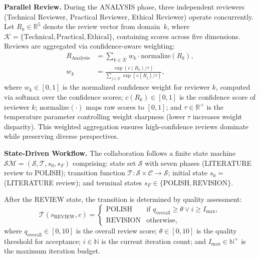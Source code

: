 \documentclass[runningheads]{llncs}
\begin{document}
\textbf{Parallel Review.} During the ANALYSIS phase, three independent reviewers (Technical Reviewer, Practical Reviewer, Ethical Reviewer) operate concurrently. Let $R_k \in \mathbb{R}^5$ denote the review vector from domain~$k$, where $\mathcal{K} = \{\text{Technical}, \text{Practical}, \text{Ethical}\}$, containing scores across five dimensions. Reviews are aggregated via confidence-aware weighting:
\begin{align}
    R_{\text{Analysis}} &= \sum_{k \in \mathcal{K}} w_k \cdot \text{normalize}(R_k), \\
    w_k &= \frac{\exp(c(R_k) / \tau)}{\sum_{j \in \mathcal{K}} \exp(c(R_j) / \tau)},
\end{align}
where $w_k \in [0, 1]$ is the normalized confidence weight for reviewer $k$, computed via softmax over the confidence scores; $c(R_k) \in [0, 1]$ is the confidence score of reviewer $k$; $\text{normalize}(\cdot)$ maps raw scores to $[0, 1]$; and $\tau \in \mathbb{R}^+$ is the temperature parameter controlling weight sharpness (lower $\tau$ increases weight disparity). This weighted aggregation ensures high-confidence reviews dominate while preserving diverse perspectives.

\textbf{State-Driven Workflow.} The collaboration follows a finite state machine $\mathcal{SM} = (\mathcal{S}, \mathcal{T}, s_0, s_F)$ comprising: state set $\mathcal{S}$ with seven phases (LITERATURE review to POLISH); transition function $\mathcal{T}: \mathcal{S} \times \mathcal{C} \rightarrow \mathcal{S}$; initial state $s_0 = $ (LITERATURE review); and terminal states $s_F \in \{\text{POLISH}, \text{REVISION}\}$.

After the REVIEW state, the transition is determined by quality assessment:
\begin{equation}
    \mathcal{T}(s_{\text{REVIEW}}, c) =
    \begin{cases}
        \text{POLISH} & \text{if } q_{\text{overall}} \geq \theta \lor i \geq I_{\max}, \\
        \text{REVISION} & \text{otherwise},
    \end{cases}
\end{equation}
where $q_{\text{overall}} \in [0, 10]$ is the overall review score; $\theta \in [0, 10]$ is the quality threshold for acceptance; $i \in \mathbb{N}$ is the current iteration count; and $I_{\max} \in \mathbb{N}^+$ is the maximum iteration budget.
\end{document}
